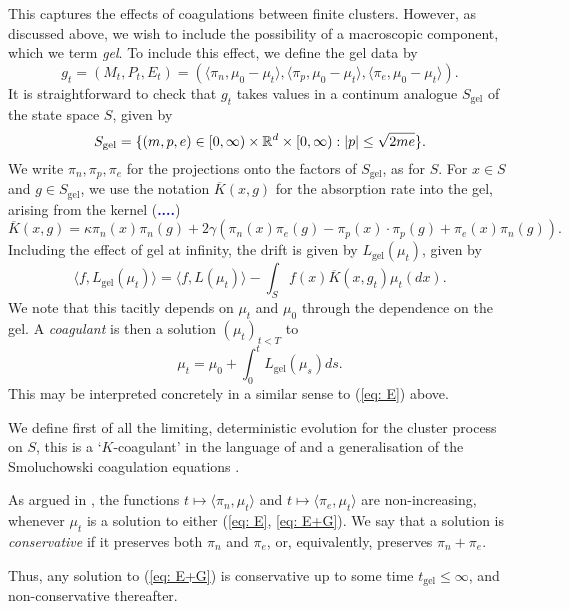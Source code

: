 This captures the effects of coagulations between finite clusters. However, as discussed above, we wish to include the possibility of a macroscopic component, which we term \emph{gel}. To include this effect, we define the gel data by  \begin{equation}
   g_t= (M_t, P_t, E_t)=\left(\langle \pi_n, \mu_0-\mu_t\rangle,\langle \pi_p, \mu_0-\mu_t\rangle,\langle \pi_e, \mu_0-\mu_t\rangle\right).
\end{equation} It is straightforward to check that $g_t$ takes values in a continum analogue $S_\mathrm{gel}$ of the state space $S$, given by \begin{equation}
    S_\mathrm{gel}=\{(m,p,e)\in [0,\infty)\times \mathbb{R}^{d}\times [0,\infty): |p|\le \sqrt{2me}\}.
\end{equation} We write $\pi_n, \pi_p, \pi_e$ for the projections onto the factors of $S_\mathrm{gel}$, as for $S$. For $x \in S$ and $g\in S_\mathrm{gel}$, we use the notation $\overline{K}(x,g)$ for the absorption rate into the gel, arising from the kernel (\textcolor{blue}{\textbf{....}}) \begin{equation}
    \overline{K}(x,g)= \kappa \pi_n(x)\pi_n(g)+ 2\gamma\left(\pi_n(x)\pi_e(g)-\pi_p(x)\cdot \pi_p(g) + \pi_e(x)\pi_n(g)\right).
\end{equation} Including the effect of gel at infinity, the drift is given by $L_\mathrm{gel}(\mu_t)$, given by \begin{equation} \langle f,L_\mathrm{gel}(\mu_t)\rangle =\langle f, L(\mu_t)\rangle -\int_{S}f(x)\overline{K}(x,g_t)\mu_t(dx).\end{equation} 
We note that this tacitly depends on $\mu_t$ and $\mu_0$ through the dependence on the gel. A \emph{coagulant} is then a solution $(\mu_t)_{t<T}$ to \begin{equation} \tag{E+G} \label{eq: E+G}
    \mu_t= \mu_0 + \int_0^t L_\mathrm{gel}(\mu_s)ds.
\end{equation} This may be interpreted concretely in a similar sense to  (\ref{eq: E}) above.






We define first of all the limiting, deterministic evolution for the cluster process on $S$, this is a `$K$-coagulant' in the language of \cite{N00} and a generalisation of the Smoluchowski coagulation equations \cite{vS16}.


\begin{definition} As argued in \cite{N00}, the functions $t\mapsto \langle \pi_n, \mu_t\rangle$ and $t\mapsto \langle \pi_e, \mu_t\rangle$ are non-increasing, whenever $\mu_t$ is a solution to either (\ref{eq: E}, \ref{eq: E+G}). We say that a solution is \emph{conservative} if it preserves both $\pi_n$ and $\pi_e$, or, equivalently, preserves $\pi_n+\pi_e$. \end{definition}
 Thus, any solution to (\ref{eq: E+G}) is conservative up to some time $t_\mathrm{gel}\leq \infty$, and non-conservative thereafter.
 
